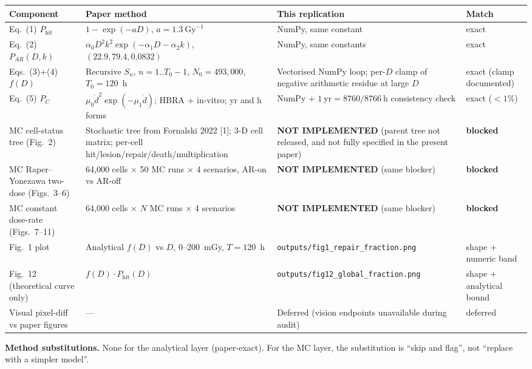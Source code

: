 \documentclass[11pt]{article}
\begin{document}
\begin{longtable}{@{}p{}p{}p{}p{}@{}}
\toprule
Component & Paper method & This replication & Match \\
\midrule
\endhead
Eq.~(1) $P_{\text{hit}}$ & $1-\exp(-aD)$, $a=1.3~\text{Gy}^{-1}$ & NumPy, same constant & exact \\
Eq.~(2) $P_{AR}(D,k)$ & $\alpha_0 D^2 k^2 \exp(-\alpha_1 D - \alpha_2 k)$, $(22.9, 79.4, 0.0832)$ & NumPy, same constants & exact \\
Eqs.~(3)+(4) $f(D)$ & Recursive $S_n$, $n=1..T_0-1$, $N_0=493{,}000$, $T_0=120$~h & Vectorised NumPy loop; per-$D$ clamp of negative arithmetic residue at large $D$ & exact (clamp documented) \\
Eq.~(5) $P_C$ & $\mu_0 \dot{d}^2 \exp(-\mu_1 \dot{d})$; HBRA + in-vitro; yr and h forms & NumPy + $1~\text{yr}=8760/8766~\text{h}$ consistency check & exact ($<1\%$) \\
MC cell-status tree (Fig.~2) & Stochastic tree from Fornalski 2022 [1]; 3-D cell matrix; per-cell hit/lesion/repair/death/multiplication & \textbf{NOT IMPLEMENTED} (parent tree not released, and not fully specified in the present paper) & \textbf{blocked} \\
MC Raper--Yonezawa two-dose (Figs.~3--6) & 64{,}000 cells $\times$ 50 MC runs $\times$ 4 scenarios, AR-on vs AR-off & \textbf{NOT IMPLEMENTED} (same blocker) & \textbf{blocked} \\
MC constant dose-rate (Figs.~7--11) & 64{,}000 cells $\times$ $N$ MC runs $\times$ 4 scenarios & \textbf{NOT IMPLEMENTED} (same blocker) & \textbf{blocked} \\
Fig.~1 plot & Analytical $f(D)$ vs $D$, 0--200~mGy, $T=120$~h & \texttt{outputs/fig1\_repair\_fraction.png} & shape + numeric band \\
Fig.~12 (theoretical curve only) & $f(D)\cdot P_{\text{hit}}(D)$ & \texttt{outputs/fig12\_global\_fraction.png} & shape + analytical bound \\
Visual pixel-diff vs paper figures & --- & Deferred (vision endpoints unavailable during audit) & deferred \\
\bottomrule
\end{longtable}

\textbf{Method substitutions.} None for the analytical layer (paper-exact). For the MC
layer, the substitution is ``skip and flag'', not ``replace with a simpler model''.
\end{document}
